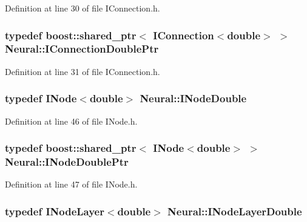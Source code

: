 Definition at line 30 of file IConnection.h.

\hypertarget{namespace_neural_a393cd7c1342291920cff93b61ed6a997}{
\subsubsection[{IConnectionDoublePtr}]{\setlength{\rightskip}{0pt plus 5cm}typedef boost::shared\_\-ptr$<$ {\bf IConnection}$<$double$>$ $>$ {\bf Neural::IConnectionDoublePtr}}}
\label{namespace_neural_a393cd7c1342291920cff93b61ed6a997}


Definition at line 31 of file IConnection.h.

\hypertarget{namespace_neural_a9181caa1e6e1b8595dddf9078d06cc15}{
\subsubsection[{INodeDouble}]{\setlength{\rightskip}{0pt plus 5cm}typedef {\bf INode}$<$double$>$ {\bf Neural::INodeDouble}}}
\label{namespace_neural_a9181caa1e6e1b8595dddf9078d06cc15}


Definition at line 46 of file INode.h.

\hypertarget{namespace_neural_afb5825612e72eb811b0268d6b3520db8}{
\subsubsection[{INodeDoublePtr}]{\setlength{\rightskip}{0pt plus 5cm}typedef boost::shared\_\-ptr$<$ {\bf INode}$<$double$>$ $>$ {\bf Neural::INodeDoublePtr}}}
\label{namespace_neural_afb5825612e72eb811b0268d6b3520db8}


Definition at line 47 of file INode.h.

\hypertarget{namespace_neural_a62a23712e05b6337f98971c88c2f269a}{
\subsubsection[{INodeLayerDouble}]{\setlength{\rightskip}{0pt plus 5cm}typedef {\bf INodeLayer}$<$double$>$ {\bf Neural::INodeLayerDouble}}}
\label{namespace_neural_a62a23712e05b6337f98971c88c2f269a}


